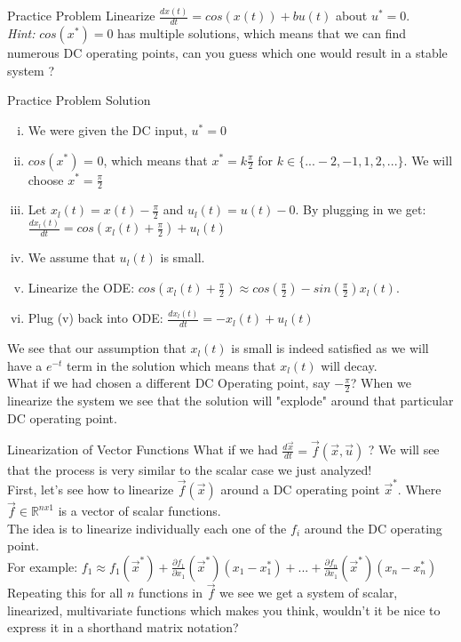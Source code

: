 \documentclass{beamer}
\newcommand{\R}{\mathbb{R}}
\begin{document}
	\begin{frame}{Practice Problem}
	Linearize $\frac{dx(t)}{dt} = cos(x(t)) + bu(t)$ about $u^* = 0$. \pause \\
	\textit{Hint:} $cos(x^*) = 0$ has multiple solutions, which means that we can find numerous DC operating points, can you guess which one would result in a stable system ? 
	\end{frame}
	\begin{frame}{Practice Problem Solution}
	\begin{enumerate}[(i)]
	    \item We were given the DC input, $u^* = 0$ \pause \\
	    \item $cos(x^*)$ = 0, which means that $x^* = k\frac{\pi}{2}$ for $k \in \{...-2,-1,1,2,...\}$. We will choose $x^* = \frac{\pi}{2}$ \pause \\
	    \item Let $x_l(t) = x(t) - \frac{\pi}{2}$ and $u_l(t) = u(t) - 0$.
	    By plugging in we get: $\frac{dx_l(t)}{dt} = cos(x_l(t) + \frac{\pi}{2}) + u_l(t)$ \pause \\
	    \item We assume that $u_l(t)$ is small.\pause \\
	    \item Linearize the ODE: $cos(x_l(t) + \frac{\pi}{2}) \approx cos(\frac{\pi}{2}) -sin(\frac{\pi}{2})x_l(t)$. \pause
	    \item Plug (v) back into ODE: 
	    $\frac{dx_l(t)}{dt} = -x_l(t) + u_l(t)$ 
	\end{enumerate}
	 \pause 
	 We see that our assumption that  $x_l(t)$ is small is indeed satisfied as we will have a $e^{-t}$ term in the solution which means that $x_l(t)$ will decay.\\ \pause
	What if we had chosen a different DC Operating point, say $-\frac{\pi}{2}$? When we linearize the system we see that the solution will "explode" around that particular DC operating point.
	\end{frame}

	\begin{frame}{Linearization of Vector Functions}
	What if we had $\frac{d\vec{x}}{dt} = \vec{f}(\vec{x}, \vec{u})$ ? We will see that the process is very similar to the scalar case we just analyzed!\\ \pause
	First, let's see how to linearize $\vec{f}(\vec{x})$ around a DC operating point $\vec{x}^*$. Where $\vec{f} \in \R^{nx1}$ is a vector of scalar functions. \\\pause
	The idea is to linearize individually each one of the $f_i$ around the DC operating point. \\\pause
	For example: $f_1 \approx f_1(\vec{x}^*) + \frac{\partial f_1}{\partial x_1}(\vec{x}^*)(x_1 - x_1^*) + ... +  \frac{\partial f_n}{\partial x_1}(\vec{x}^*)(x_n - x_n^*)$\\\pause
	Repeating this for all $n$ functions in $\vec{f}$ we see we get a system of scalar, linearized, multivariate functions which makes you think, wouldn't it be nice to express it in a shorthand matrix notation?
	\end{frame}
\end{document}
